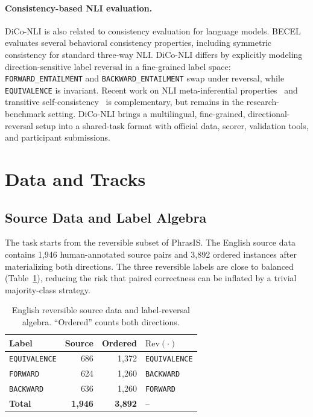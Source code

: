 \documentclass[11pt]{article}
\newcommand{\Rev}{\mathrm{Rev}}
\begin{document}
\paragraph{Consistency-based NLI evaluation.}
DiCo-NLI is also related to consistency evaluation for language models.
BECEL~\cite{jang2022becel} evaluates several behavioral consistency properties, including symmetric consistency for standard three-way NLI.
DiCo-NLI differs by explicitly modeling direction-sensitive label reversal in a fine-grained label space: \texttt{FORWARD\_ENTAILMENT} and \texttt{BACKWARD\_ENTAILMENT} swap under reversal, while \texttt{EQUIVALENCE} is invariant.
Recent work on NLI meta-inferential properties~\cite{blanck2026reverse} and transitive self-consistency~\cite{wu2025transitive} is complementary, but remains in the research-benchmark setting.
DiCo-NLI brings a multilingual, fine-grained, directional-reversal setup into a shared-task format with official data, scorer, validation tools, and participant submissions.

\section{Data and Tracks}

\subsection{Source Data and Label Algebra}

The task starts from the reversible subset of PhrasIS.
The English source data contains 1,946 human-annotated source pairs and 3,892 ordered instances after materializing both directions.
The three reversible labels are close to balanced (Table~\ref{tab:label-data}), reducing the risk that paired correctness can be inflated by a trivial majority-class strategy.

\begin{table}[t]
\centering
\small
\begin{tabular}{@{}lrrl@{}}
\toprule
Label & Source & Ordered & $\Rev(\cdot)$ \\
\midrule
\texttt{EQUIVALENCE} & 686 & 1,372 & \texttt{EQUIVALENCE} \\
\texttt{FORWARD} & 624 & 1,260 & \texttt{BACKWARD} \\
\texttt{BACKWARD} & 636 & 1,260 & \texttt{FORWARD} \\
\midrule
\textbf{Total} & \textbf{1,946} & \textbf{3,892} & -- \\
\bottomrule
\end{tabular}
\caption{English reversible source data and label-reversal algebra. ``Ordered'' counts both directions.}
\label{tab:label-data}
\end{table}
\end{document}
